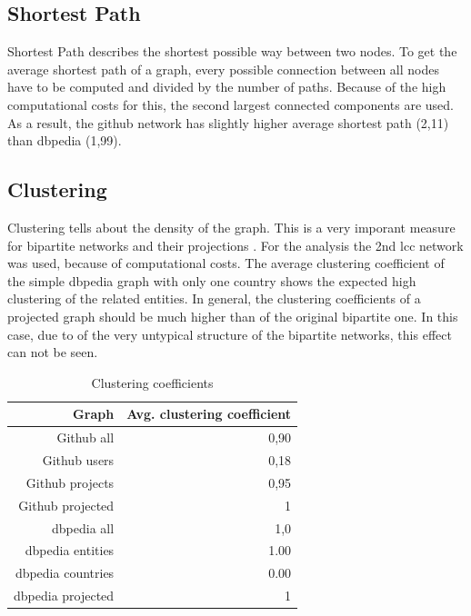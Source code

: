 \documentclass[
a4paper,     %
12pt         %
]{scrartcl}  %
\begin{document}
\subsection{Shortest Path}
\label{sub:shortest-path}

Shortest Path describes the shortest possible way between two nodes. To get the average shortest path of a graph, every possible connection between all nodes have to be computed and divided by the number of paths. Because of the high computational costs for this, the second largest connected components are used. As a result, the github network has slightly higher average shortest path (2,11) than dbpedia (1,99).

\subsection{Clustering}
\label{sub:clustering}

Clustering tells about the density of the graph. This is a very imporant measure for bipartite networks and their projections \citep{latapy_basic_2008}. For the analysis the 2nd lcc network was used, because of computational costs. The average clustering coefficient of the simple dbpedia graph with only one country shows the expected high clustering of the related entities. In general, the clustering coefficients of a projected graph should be much higher than of the original bipartite one. In this case, due to of the very untypical structure of the bipartite networks, this effect can not be seen.

\begin{table}[h!]
  \begin{center}
    \begin{tabular}{rr}
      \toprule
      Graph & Avg. clustering coefficient \\
      \midrule
             Github all & 0,90 \\
             Github users & 0,18 \\
             Github projects & 0,95 \\
             Github projected & 1 \\
             dbpedia all & 1,0 \\
             dbpedia entities & 1.00 \\
             dbpedia countries & 0.00 \\
             dbpedia projected & 1 \\
    \end{tabular}
  \end{center}
  \caption{Clustering coefficients}
  \label{tab:clustering}
\end{table}
\end{document}
